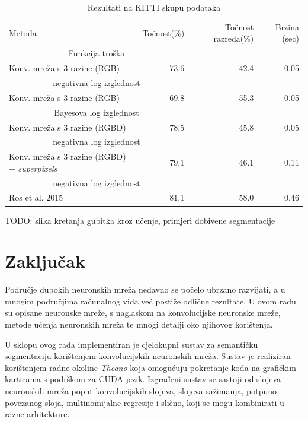 \documentclass[times, utf8, diplomski, numeric]{fer}
\begin{document}
\begin{table}
\centering
\begin{tabular}{l r r r}
  Metoda & Točnost(\%) & Točnost razreda(\%) & Brzina (sec) \\
    \multicolumn{2}{c}{Funkcija troška} & & \\[0.6em] \hline

  Konv. mreža s 3 razine (RGB) & 73.6 & 42.4 & 0.05 \\
    \multicolumn{2}{c}{negativna log izglednost} & & \\ \hline
  Konv. mreža s 3 razine (RGB) & 69.8 & 55.3 & 0.05 \\
    \multicolumn{2}{c}{Bayesova log izglednost} & & \\ \hline
  Konv. mreža s 3 razine (RGBD) & 78.5 & 45.8 & 0.05 \\
    \multicolumn{2}{c}{negativna log izglednost} & & \\ \hline
  Konv. mreža s 3 razine (RGBD) + \textit{superpixels} & 79.1 & 46.1 & 0.11 \\
    \multicolumn{2}{c}{negativna log izglednost} & & \\ \hline \hline
  Ros et al.\cite{ros:2015} 2015 & 81.1 & 58.0 & 0.46
\end{tabular}
\caption{Rezultati na KITTI skupu podataka}
\end{table}

TODO: slika kretanja gubitka kroz učenje, primjeri dobivene segmentacije

\chapter{Zaključak}

Područje dubokih neuronskih mreža nedavno se počelo ubrzano razvijati, a u mnogim područjima računalnog vida već postiže odlične rezultate. U ovom radu su opisane neuronske mreže, s naglaskom na konvolucijske neuronske mreže, metode učenja neuronskih mreža te mnogi detalji oko njihovog korištenja.

U sklopu ovog rada implementiran je cjelokupni sustav za semantičku segmentaciju korištenjem konvolucijskih neuronskih mreža. Sustav je realiziran korištenjem radne okoline \textit{Theano} koja omogućuju pokretanje koda na grafičkim karticama s podrškom za CUDA jezik. Izgrađeni sustav se sastoji od slojeva neuronskih mreža poput konvolucijskih slojeva, slojeva sažimanja, potpuno povezanog sloja, multinomijalne regresije i slično, koji se mogu kombinirati u razne arhitekture.
\end{document}
